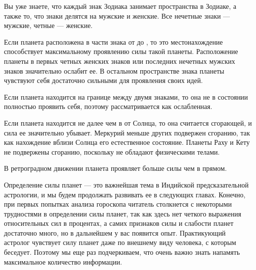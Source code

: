 Вы уже знаете, что каждый знак Зодиака занимает  пространства в Зодиаке, а также то, что знаки делятся на мужские и женские. Все нечетные знаки --- мужские, четные --- женские.

Если планета расположена в части знака от  до , то это местонахождение способствует максимальному проявлению силы такой планеты. Расположение планеты в первых  четных женских знаков или последних  нечетных мужских знаков значительно ослабит ее. В остальном пространстве знака планеты чувствуют себя достаточно сильными для проявления своих идей.

Если планета находится на границе между двумя знаками, то она не в состоянии полностью проявить себя, поэтому рассматривается как ослабленная.

Если планета находится не далее чем в  от Солнца, то она считается сгорающей, и сила ее значительно убывает. Меркурий меньше других подвержен сгоранию, так как нахождение вблизи Солнца его естественное состояние. Планеты Раху и Кету не подвержены сгоранию, поскольку не обладают физическими телами.

В ретроградном движении планета проявляет больше силы чем в прямом.

Определение силы планет --- это важнейшая тема в Индийской предсказательной астрологии, и мы будем продолжать развивать ее в следующих главах. Конечно, при первых попытках анализа гороскопа читатель столкнется с некоторыми трудностями в определении силы планет, так как здесь нет четкого выражения относительных сил в процентах, а самих признаков силы и слабости планет достаточно много, но в дальнейшем у вас появится опыт. Практикующий астролог чувствует силу планет даже по внешнему виду человека, с которым беседует. Поэтому мы еще раз подчеркиваем, что очень важно знать напамять максимальное количество информации.
